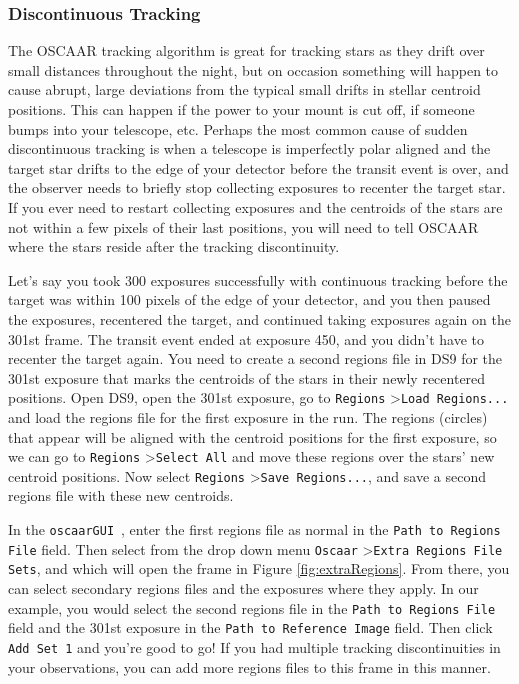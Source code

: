 \documentclass[a4paper]{article}
\newcommand{\code}[1]{\texttt{#1}}
\newcommand{\gui}{\code{oscaarGUI}~}
\begin{document}
\subsubsection{Discontinuous Tracking}
The OSCAAR tracking algorithm is great for tracking stars as they drift over small distances throughout the night, but on occasion something will happen to cause abrupt, large deviations from the typical small drifts in stellar centroid positions. This can happen if the power to your mount is cut off, if someone bumps into your telescope, etc. Perhaps the most common cause of sudden discontinuous tracking is when a telescope is imperfectly polar aligned and the target star drifts to the edge of your detector before the transit event is over, and the observer needs to briefly stop collecting exposures to recenter the target star. If you ever need to restart collecting exposures and the centroids of the stars are not within a few pixels of their last positions, you will need to tell OSCAAR where the stars reside after the tracking discontinuity. 

Let's say you took 300 exposures successfully with continuous tracking before the target was within 100 pixels of the edge of your detector, and you then paused the exposures, recentered the target, and continued taking exposures again on the 301st frame. The transit event ended at exposure 450, and you didn't have to recenter the target again. You need to create a second regions file in DS9 for the 301st exposure that marks the centroids of the stars in their newly recentered positions. Open DS9, open the 301st exposure, go to \code{Regions} \textgreater  \code{Load Regions...} and load the regions file for the first exposure in the run. The regions (circles) that appear will be aligned with the centroid positions for the first exposure, so we can go to \code{Regions} \textgreater  \code{Select All} and move these regions over the stars' new centroid positions. Now select \code{Regions} \textgreater  \code{Save Regions...}, and save a second regions file with these new centroids. 

In the \gui, enter the first regions file as normal in the \code{Path to Regions File} field. Then select from the drop down menu \code{Oscaar} \textgreater \code{Extra Regions File Sets}, and which will open the frame in Figure \ref{fig:extraRegions}. From there, you can select secondary regions files and the exposures where they apply. In our example, you would select the second regions file in the \code{Path to Regions File} field and the 301st exposure in the \code{Path to Reference Image} field. Then click \code{Add Set 1} and you're good to go! If you had multiple tracking discontinuities in your observations, you can add more regions files to this frame in this manner.
\end{document}
